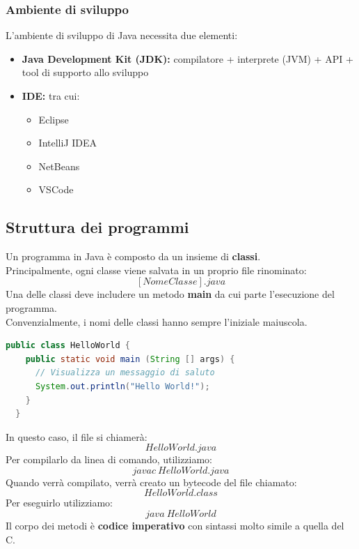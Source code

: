 \documentclass[12pt,a4paper]{article}
\begin{document}
\subsubsection{Ambiente di sviluppo}
L'ambiente di sviluppo di Java necessita due elementi:
\begin{itemize}
  \item \textbf{Java Development Kit (JDK):} compilatore + interprete (JVM) + API + tool di supporto allo sviluppo
  \item \textbf{IDE:} tra cui:
  \begin{itemize}
    \item Eclipse
    \item IntelliJ IDEA
    \item NetBeans
    \item VSCode
  \end{itemize}
\end{itemize}
\subsection{Struttura dei programmi}
Un programma in Java è composto da un insieme di \textbf{classi}.\\
Principalmente, ogni classe viene salvata in un proprio file rinominato:
\[
[NomeClasse].java
\]
Una delle classi deve includere un metodo \textbf{main} da cui parte l'esecuzione del programma.\\
Convenzialmente, i nomi delle classi hanno sempre l'iniziale maiuscola.\\
\begin{lstlisting}[language=Java]
  public class HelloWorld {
    public static void main (String [] args) {
      // Visualizza un messaggio di saluto
      System.out.println("Hello World!");
    }
  }
\end{lstlisting}
In questo caso, il file si chiamerà:
\[
HelloWorld.java
\]
Per compilarlo da linea di comando, utilizziamo:
\[
javac\ HelloWorld.java
\]
Quando verrà compilato, verrà creato un bytecode del file chiamato:
\[
HelloWorld.class
\]
Per eseguirlo utilizziamo:
\[
java\ HelloWorld
\]
Il corpo dei metodi è \textbf{codice imperativo} con sintassi molto simile a quella del C.
\end{document}
